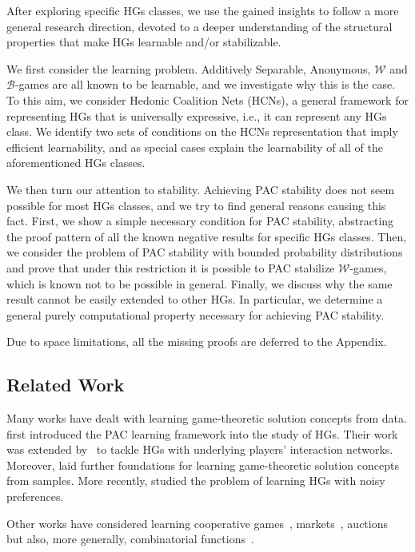 \documentclass[letterpaper]{article} %
\begin{document}
After exploring specific HGs classes, we use the gained insights to follow a more general research direction, devoted to a deeper understanding of the structural properties that make HGs learnable and/or stabilizable.

We first consider the learning problem. Additively Separable, Anonymous, $\mathcal{W}$ and $\mathcal{B}$-games are all known to be learnable, and we investigate why this is the case. To this aim, we consider Hedonic Coalition Nets (HCNs), a general framework for representing HGs that is universally expressive, i.e., it can represent any HGs class. 
We identify two sets of conditions on the HCNs representation that imply efficient learnability, and as special cases explain the learnability of all of the aforementioned HGs classes.

We then turn our attention to stability. Achieving PAC stability does not seem possible for most HGs classes, and we try to find general reasons causing this fact. 
First, we show a simple necessary condition for PAC stability, abstracting the proof pattern of all the known negative results for specific HGs classes.
Then, we consider the problem of PAC stability with bounded probability distributions and prove that under this restriction it is possible to PAC stabilize $\mathcal{W}$-games, which is known not to be possible in general. Finally, we discuss why the same result cannot be easily extended to other HGs. In particular, we determine a general purely computational property 
necessary for achieving PAC stability.

Due to space limitations, all the missing proofs are deferred to the Appendix.

\subsection{Related Work}
Many works have dealt with learning game-theoretic solution concepts from data.
\citet{SliwinskiZ17} first introduced the PAC learning framework into the study of HGs. Their work was extended by~\citet{IgarashiSZ19} to tackle HGs with underlying players' interaction networks. Moreover, \citet{JhaZick20} laid further foundations for learning game-theoretic solution concepts from samples. More recently, \citet{HGnoisy} studied the problem of learning HGs with noisy preferences.

Other works have considered learning cooperative games~\cite{BalcanPZ15}, markets~\cite{LevPVZick21}, auctions~\cite{BalcanMultiItem} but also, more generally, combinatorial functions~\cite{BalcanPairwise, BalcanSubmodular}.
\end{document}
